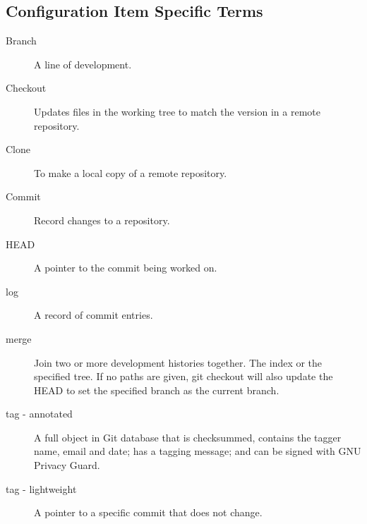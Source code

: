 \subsection{Configuration Item Specific Terms}
\begin{description}
\item[Branch] \quad A line of development.

\item[Checkout] \quad Updates files in the working tree to match the version in
  a remote repository.

\item[Clone] \quad To make a local copy of a remote repository.

\item[Commit] \quad Record changes to a repository.

\item[HEAD] \quad A pointer to the commit being worked on.

\item[log] \quad A record of commit entries.

\item[merge] \quad Join two or more development histories together.  The index
  or the specified tree.  If no paths are given, git checkout will also update
  the HEAD to set the specified branch as the current branch.

\item[tag - annotated] \quad A full object in Git database that is checksummed,
  contains the tagger name, email and date; has a tagging message; and can be
  signed with GNU Privacy Guard.

\item[tag - lightweight] \quad A pointer to a specific commit that does not change.


\end{description}
